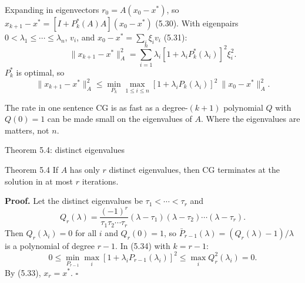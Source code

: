 \documentclass[12pt,aspectratio=169]{beamer}
\begin{document}
\begin{frame}{Expanding in eigenvectors}
  $r_0=A(x_0-x^*)$, so $x_{k+1}-x^* = [I+P_k^*(A)A](x_0-x^*)$ (5.30).
  With eigenpairs $0<\lambda_1\le\cdots\le\lambda_n$, $v_i$, and $x_0-x^*=\sum_i\xi_iv_i$ (5.31):
  \begin{equation}
    \|x_{k+1}-x^*\|_A^2 = \sum_{i=1}^n\lambda_i[1+\lambda_iP_k^*(\lambda_i)]^2\xi_i^2. \tag{5.32}
  \end{equation}
  $P_k^*$ is optimal, so
  \begin{equation}
    \|x_{k+1}-x^*\|_A^2 \le \min_{P_k}\max_{1\le i\le n}[1+\lambda_iP_k(\lambda_i)]^2\ \|x_0-x^*\|_A^2. \tag{5.33}
  \end{equation}
  \begin{block}{The rate in one sentence}
    CG is as fast as a degree-$(k{+}1)$ polynomial $Q$ with $Q(0)=1$ can be made small on the eigenvalues of $A$.
    \alert{Where the eigenvalues are} matters, not $n$.
  \end{block}
\end{frame}

\begin{frame}{Theorem 5.4: distinct eigenvalues}
  \begin{block}{Theorem 5.4}
    If $A$ has only $r$ distinct eigenvalues, then CG terminates at the solution in at most $r$ iterations.
  \end{block}
  \textbf{Proof.} Let the distinct eigenvalues be $\tau_1<\cdots<\tau_r$ and
  \[
    Q_r(\lambda) = \frac{(-1)^r}{\tau_1\tau_2\cdots\tau_r}(\lambda-\tau_1)(\lambda-\tau_2)\cdots(\lambda-\tau_r).
  \]
  Then $Q_r(\lambda_i)=0$ for all $i$ and $Q_r(0)=1$, so $\bar P_{r-1}(\lambda)=(Q_r(\lambda)-1)/\lambda$ is a polynomial of degree $r-1$.
  In (5.34) with $k=r-1$:
  \[
    0 \le \min_{P_{r-1}}\max_i[1+\lambda_iP_{r-1}(\lambda_i)]^2 \le \max_iQ_r^2(\lambda_i) = 0.
  \]
  By (5.33), $x_r=x^*$. \hfill$\square$
\end{frame}
\end{document}
